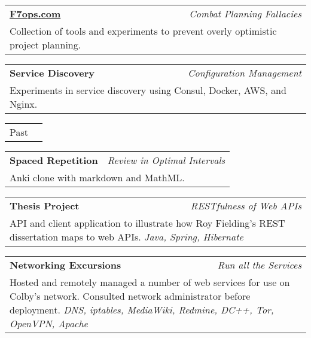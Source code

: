 \documentclass[10pt]{article} %
\begin{document}
{\begin{minipage}[t]{0.44\textwidth}
\vspace{5pt}

\begin{tabularx}{\linewidth}{ X r }
  {\href{http://www.f7ops.com}{\textbf{F7ops.com}}} & {\small\textit{Combat Planning Fallacies}} \\
  \multicolumn{2}{p{\textwidth-2\fboxrule}}{ \small{ Collection of tools and experiments to prevent overly optimistic project planning. }}
\end{tabularx}

\vspace{5pt}

\begin{tabularx}{\linewidth}{ X r }
  {\textbf{Service Discovery}} & {\small\textit{Configuration Management}} \\
  \multicolumn{2}{p{\textwidth-2\fboxrule}}{ \small{Experiments in service discovery using Consul, Docker, AWS, and Nginx. }}
\end{tabularx}

\vspace{10pt}

\begin{tabularx}{\linewidth}{ X r }
  {\large Past} \\
\end{tabularx}

\vspace{5pt}

\begin{tabularx}{\linewidth}{ X r }
  {\textbf{Spaced Repetition}} & {\small\textit{Review in Optimal Intervals}} \\
  \multicolumn{2}{p{\textwidth-2\fboxrule}}{ \small{ Anki clone with markdown and MathML. }}
\end{tabularx}

\vspace{10pt}

\begin{tabularx}{\linewidth}{ X r }
  {\textbf{Thesis Project}} & {\small\textit{RESTfulness of Web APIs}} \\
  \multicolumn{2}{p{\textwidth-2\fboxrule}}{ \small{ API and client application to illustrate how Roy Fielding's REST dissertation maps to web APIs. \textit{Java, Spring, Hibernate} }}
\end{tabularx}

\vspace{5pt}

\begin{tabularx}{\linewidth}{ X r }
  {\textbf{Networking Excursions}} & {\small\textit{Run all the Services}} \\
  \multicolumn{2}{p{\textwidth-2\fboxrule}}{ \small{Hosted and remotely managed a number of web services for use on Colby's network. Consulted network administrator before deployment. \textit{DNS, iptables, MediaWiki, Redmine, DC++, Tor, OpenVPN, Apache}}}
\end{tabularx}


\end{minipage}}
\end{document}
